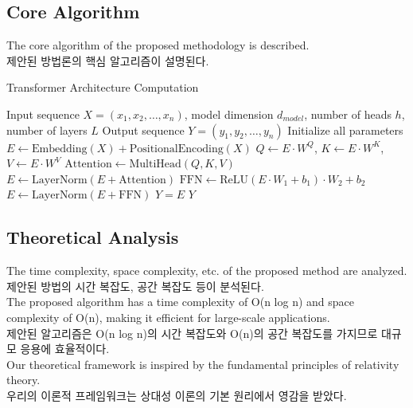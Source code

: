 \documentclass[preprint,12pt]{elsarticle}
\begin{document}
\subsection{Core Algorithm}
The core algorithm of the proposed methodology is described. \\
제안된 방법론의 핵심 알고리즘이 설명된다. \\

\begin{algorithm}
\caption{Transformer Architecture Computation}
\label{alg:transformer}
\begin{algorithmic}[1]
\REQUIRE Input sequence $X = (x_1, x_2, \ldots, x_n)$, model dimension $d_{model}$, number of heads $h$, number of layers $L$
\ENSURE Output sequence $Y = (y_1, y_2, \ldots, y_n)$
\STATE Initialize all parameters
\STATE $E \leftarrow \text{Embedding}(X) + \text{PositionalEncoding}(X)$
    \STATE $Q \leftarrow E \cdot W^Q$, $K \leftarrow E \cdot W^K$, $V \leftarrow E \cdot W^V$
    \STATE $\text{Attention} \leftarrow \text{MultiHead}(Q, K, V)$
    \STATE $E \leftarrow \text{LayerNorm}(E + \text{Attention})$
    \STATE $\text{FFN} \leftarrow \text{ReLU}(E \cdot W_1 + b_1) \cdot W_2 + b_2$
    \STATE $E \leftarrow \text{LayerNorm}(E + \text{FFN})$
\ENDFOR
\STATE $Y = E$ 
\RETURN $Y$
\end{algorithmic}
\end{algorithm}

\subsection{Theoretical Analysis}
The time complexity, space complexity, etc. of the proposed method are analyzed. \\
제안된 방법의 시간 복잡도, 공간 복잡도 등이 분석된다. \\

The proposed algorithm has a time complexity of O(n log n) and space complexity of O(n), making it efficient for large-scale applications. \\
제안된 알고리즘은 O(n log n)의 시간 복잡도와 O(n)의 공간 복잡도를 가지므로 대규모 응용에 효율적이다. \\

Our theoretical framework is inspired by the fundamental principles of relativity theory. \\
우리의 이론적 프레임워크는 상대성 이론의 기본 원리에서 영감을 받았다. \\
\end{document}
